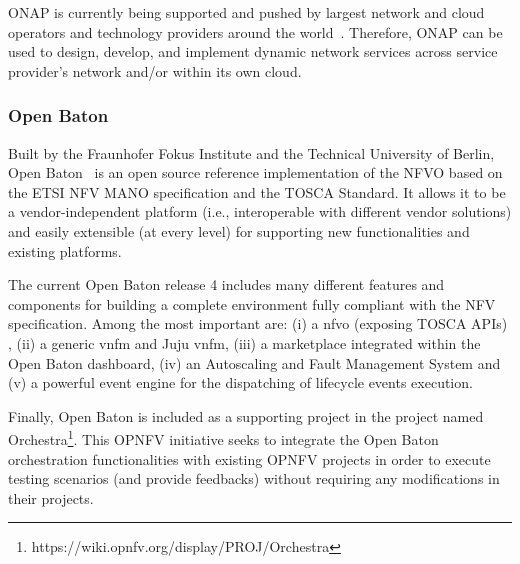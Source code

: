 ONAP is currently being supported and pushed by largest network and cloud operators and technology providers around the world~\cite{onapGuide}. Therefore, ONAP can be used to design, develop, and implement dynamic network services across service provider's network and/or within its own cloud.


\subsubsection{Open Baton}
Built by the Fraunhofer Fokus Institute and the Technical University of Berlin, Open Baton~\cite{openbatongit} is an open source reference implementation of the NFVO based on the ETSI NFV MANO specification and the TOSCA Standard. It allows it to be a vendor-independent platform (i.e., interoperable with different vendor solutions) and easily extensible (at every level) for supporting new functionalities and existing platforms.

The current Open Baton release 4 includes many different features and components for building a complete environment fully compliant with the NFV specification. Among the most important are: (i) a \gls{nfvo} (exposing TOSCA APIs) , (ii) a generic \gls{vnfm} and Juju \gls{vnfm}, (iii) a marketplace integrated within the Open Baton dashboard, (iv) an Autoscaling and Fault Management System and (v) a powerful event engine for the dispatching of lifecycle events execution.

Finally, Open Baton is included as a supporting project in the project named Orchestra\footnote{https://wiki.opnfv.org/display/PROJ/Orchestra}. This OPNFV initiative seeks to integrate the Open Baton orchestration functionalities with existing OPNFV projects in order to execute testing scenarios (and provide feedbacks) without requiring any modifications in their projects.


